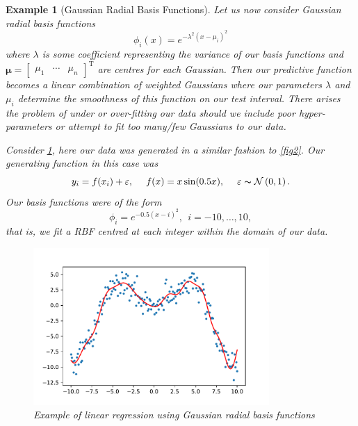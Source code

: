 \documentclass[10pt,a4paper, onecolumn, conference]{IEEEtran}
\theoremstyle{own}
\newtheorem{example}{Example}
\theoremstyle{definition}
\theoremstyle{plain}
\begin{document}
\begin{example}[Gaussian Radial Basis Functions]
Let us now consider Gaussian radial basis functions
\begin{equation}
\phi_i(x) = e^{-\lambda^{2} ( x - \mu_i ) ^{2} }
\end{equation}
where $\lambda$ is some coefficient representing the variance of our basis functions and $\boldsymbol\mu = \left[ \begin{matrix} \mu_1 & \cdots & \mu_n \end{matrix} \right]^{\text{T}}$ are centres for each Gaussian. Then our predictive function becomes a linear combination of weighted Gaussians where our parameters $\lambda$ and $\mu_i$ determine the smoothness of this function on our test interval. There arises the problem of under or over-fitting our data should we include poor hyper-parameters or attempt to fit too many/few Gaussians to our data.

Consider \cref{fig3}, here our data was generated in a similar fashion to \cref{fig2}. Our generating function in this case was
\begin{equation}
y_i = f(x_i) + \varepsilon, ~~~~ f(x) = x \sin(0.5x), ~~~~ \varepsilon \thicksim \mathcal{N} \left( 0, 1 \right).
\end{equation}
Our basis functions were of the form
\begin{equation}
\phi_i = e^{-0.5 ( x - i ) ^{2} },~~ i = -10, \ldots, 10,
\end{equation}
that is, we fit a RBF centred at each integer within the domain of our data.
\begin{figure}[H]
\centering
\includegraphics[width = 0.8\textwidth]{f5}
\caption{Example of linear regression using Gaussian radial basis functions}
\label{fig3}
\end{figure}
\end{example}
\end{document}
